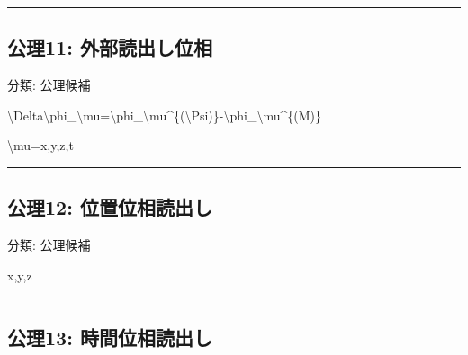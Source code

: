 \documentclass[
  a4paper,
]{ltjsarticle}
\newenvironment{Shaded}{}{}
\newcommand{\NormalTok}[1]{#1}
\begin{document}
\begin{center}\rule{0.5\linewidth}{0.5pt}\end{center}

\subsection{公理11:
外部読出し位相}\label{ux516cux740611-ux5916ux90e8ux8aadux51faux3057ux4f4dux76f8}

分類: 公理候補

\begin{Shaded}
\begin{Highlighting}[]
\NormalTok{\textbackslash{}Delta\textbackslash{}phi\_\textbackslash{}mu=\textbackslash{}phi\_\textbackslash{}mu\^{}\{(\textbackslash{}Psi)\}{-}\textbackslash{}phi\_\textbackslash{}mu\^{}\{(M)\}}
\end{Highlighting}
\end{Shaded}

\begin{Shaded}
\begin{Highlighting}[]
\NormalTok{\textbackslash{}mu=x,y,z,t}
\end{Highlighting}
\end{Shaded}

\begin{center}\rule{0.5\linewidth}{0.5pt}\end{center}

\subsection{公理12:
位置位相読出し}\label{ux516cux740612-ux4f4dux7f6eux4f4dux76f8ux8aadux51faux3057}

分類: 公理候補

\begin{Shaded}
\begin{Highlighting}[]
\NormalTok{x,y,z}
\end{Highlighting}
\end{Shaded}

\begin{center}\rule{0.5\linewidth}{0.5pt}\end{center}

\subsection{公理13:
時間位相読出し}\label{ux516cux740613-ux6642ux9593ux4f4dux76f8ux8aadux51faux3057}
\end{document}
